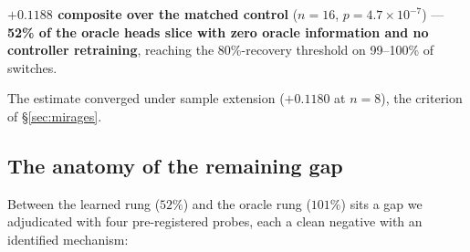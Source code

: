 \documentclass[11pt]{article}
\begin{document}
\begin{center}
\textbf{$+0.1188$ composite over the matched control} ($n{=}16$,
$p=4.7\times10^{-7}$) --- \textbf{52\% of the oracle heads slice with zero
oracle information and no controller retraining}, reaching the 80\%-recovery
threshold on 99--100\% of switches.
\end{center}

The estimate converged under sample extension ($+0.1180$ at $n{=}8$), the
criterion of \S\ref{sec:mirages}.

\subsection{The anatomy of the remaining gap}
\label{sec:gap-anatomy}

Between the learned rung ($52\%$) and the oracle rung ($101\%$) sits a gap we
adjudicated with four pre-registered probes, each a clean negative with an
identified mechanism:
\end{document}
